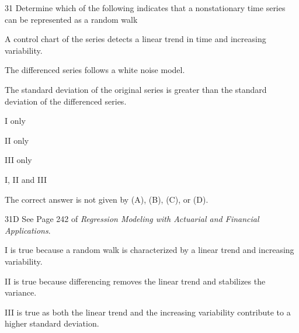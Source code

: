 \begin{question}{31}
Determine which of the following indicates that a nonstationary time series can be represented as a random walk
\begin{statements}
\item A control chart of the series detects a linear trend in time and increasing variability.
\item The differenced series follows a white noise model.
\item The standard deviation of the original series is greater than the standard deviation of the differenced series.
\end{statements}

\begin{choices}
\item I only
\item II only
\item III only
\item I, II and III
\item The correct answer is not given by (A), (B), (C), or (D).
\end{choices}
\end{question}
\begin{solution}{31}{D}
See Page 242 of \textit{Regression Modeling with Actuarial and Financial Applications}.

I is true because a random walk is characterized by a linear trend and increasing variability.

II is true because differencing removes the linear trend and stabilizes the variance.

III is true as both the linear trend and the increasing variability contribute to a higher standard deviation.
\end{solution}

